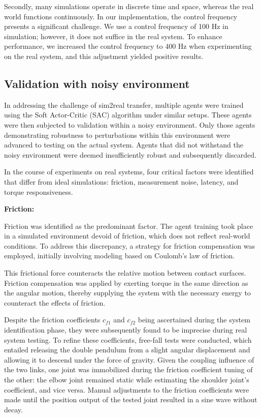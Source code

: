 Secondly, many simulations operate in discrete time and space, whereas the real world functions continuously. In our implementation, the control frequency presents a significant challenge. We use a control frequency of 100 Hz in simulation; however, it does not suffice in the real system. To enhance performance, we increased the control frequency to 400 Hz when experimenting on the real system, and this adjustment yielded positive results.

\subsection{Validation with noisy environment}
In addressing the challenge of sim2real transfer, multiple agents were trained using the Soft Actor-Critic (SAC) algorithm under similar setups. These agents were then subjected to validation within a noisy environment. Only those agents demonstrating robustness to perturbations within this environment were advanced to testing on the actual system. Agents that did not withstand the noisy environment were deemed insufficiently robust and subsequently discarded.

In the course of experiments on real systems, four critical factors were identified that differ from ideal simulations: friction, measurement noise, latency, and torque responsiveness.

\textbf{Friction:}

Friction was identified as the predominant factor. The agent training took place in a simulated environment devoid of friction, which does not reflect real-world conditions. To address this discrepancy, a strategy for friction compensation was employed, initially involving modeling based on Coulomb’s law of friction.

This frictional force counteracts the relative motion between contact surfaces. Friction compensation was applied by exerting torque in the same direction as the angular motion, thereby supplying the system with the necessary energy to counteract the effects of friction.

Despite the friction coefficients \(c_{f1}\) and \(c_{f2}\) being ascertained during the system identification phase, they were subsequently found to be imprecise during real system testing. To refine these coefficients, free-fall tests were conducted, which entailed releasing the double pendulum from a slight angular displacement and allowing it to descend under the force of gravity. Given the coupling influence of the two links, one joint was immobilized during the friction coefficient tuning of the other: the elbow joint remained static while estimating the shoulder joint's coefficient, and vice versa. Manual adjustments to the friction coefficients were made until the position output of the tested joint resulted in a sine wave without decay.

